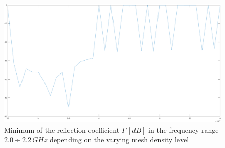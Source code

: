 \documentclass[12pt,a4paper,twocolumn]{article}
\begin{document}
{%

\begin{center}
	\begin{figure}[h]
		\includegraphics[scale=0.3]{mesh_levels.png}
		\caption{{Minimum of the reflection coefficient $\Gamma\, [dB]$ in the frequency range $2.0\div 2.2\,GHz$ depending on the varying mesh density level}}
	\end{figure}
\end{center}

}
\end{document}
